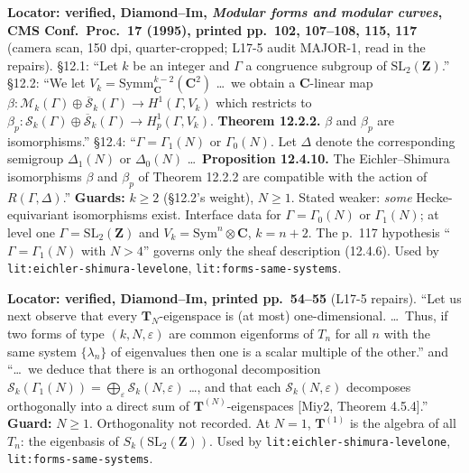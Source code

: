 \begin{hypothesis}\label{lit:diamond-im-es}
   \leanok
  \textbf{Locator: verified, Diamond--Im, \emph{Modular forms and modular curves}, CMS Conf.\ Proc.\ 17 (1995), printed
  pp.~102, 107--108, 115, 117} (camera scan, 150 dpi, quarter-cropped; L17-5 audit MAJOR-1, read in the repairs).
  \S12.1: ``Let $k$ be an integer and $\Gamma$ a congruence subgroup of $\mathrm{SL}_2(\mathbf Z)$.'' \S12.2: ``We let
  $V_k=\mathrm{Symm}^{k-2}_{\mathbf C}(\mathbf C^2)$ \dots\ we obtain a $\mathbf C$-linear map $\beta\colon\mathcal M_k(\Gamma)\oplus
  \overline{\mathcal S}_k(\Gamma)\to H^1(\Gamma,V_k)$ which restricts to $\beta_p\colon\mathcal S_k(\Gamma)\oplus\overline{\mathcal S}_k(\Gamma)
  \to H^1_p(\Gamma,V_k)$. \textbf{Theorem 12.2.2.} $\beta$ and $\beta_p$ are isomorphisms.'' \S12.4: ``$\Gamma=\Gamma_1(N)$ or
  $\Gamma_0(N)$. Let $\Delta$ denote the corresponding semigroup $\Delta_1(N)$ or $\Delta_0(N)$ \dots\ \textbf{Proposition 12.4.10.}
  The Eichler--Shimura isomorphisms $\beta$ and $\beta_p$ of Theorem 12.2.2 are compatible with the action of $R(\Gamma,\Delta)$.''
  \textbf{Guards:} $k\ge2$ (\S12.2's weight), $N\ge1$. Stated weaker: \emph{some} Hecke-equivariant isomorphisms exist.
  Interface data for $\Gamma=\Gamma_0(N)$ or $\Gamma_1(N)$; at level one $\Gamma=\mathrm{SL}_2(\mathbf Z)$ and $V_k=\mathrm{Sym}^{n}\otimes\mathbf C$,
  $k=n+2$. The p.~117 hypothesis ``$\Gamma=\Gamma_1(N)$ with $N>4$'' governs only the sheaf description (12.4.6).
  Used by \texttt{lit:eichler-shimura-levelone}, \texttt{lit:forms-same-systems}.
\end{hypothesis}

\begin{hypothesis}\label{lit:diamond-im-eigen}
   \leanok
  \textbf{Locator: verified, Diamond--Im, printed pp.~54--55} (L17-5 repairs). ``Let us next observe that every
  $\mathbf T_N$-eigenspace is (at most) one-dimensional. \dots\ Thus, if two forms of type $(k,N,\varepsilon)$ are common
  eigenforms of $T_n$ for all $n$ with the same system $\{\lambda_n\}$ of eigenvalues then one is a scalar multiple of the
  other.'' and ``\dots\ we deduce that there is an orthogonal decomposition $\mathcal S_k(\Gamma_1(N))=\bigoplus_\varepsilon
  \mathcal S_k(N,\varepsilon)$ \dots, and that each $\mathcal S_k(N,\varepsilon)$ decomposes orthogonally into a direct sum of
  $\mathbf T^{(N)}$-eigenspaces [Miy2, Theorem 4.5.4].''
  \textbf{Guard:} $N\ge1$. Orthogonality not recorded. At $N=1$, $\mathbf T^{(1)}$ is the algebra of all $T_n$: the
  eigenbasis of $S_k(\mathrm{SL}_2(\mathbf Z))$. Used by \texttt{lit:eichler-shimura-levelone}, \texttt{lit:forms-same-systems}.
\end{hypothesis}


